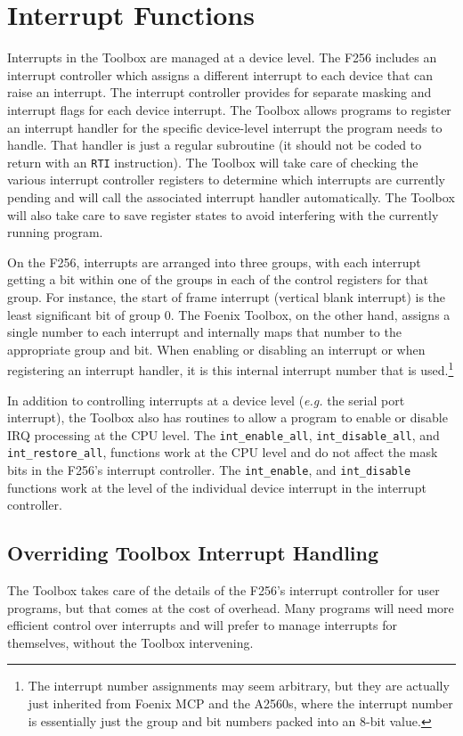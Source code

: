 \section{Interrupt Functions}
Interrupts in the Toolbox are managed at a device level.
The F256 includes an interrupt controller which assigns a different interrupt to each device that can raise an interrupt.
The interrupt controller provides for separate masking and interrupt flags for each device interrupt.
The Toolbox allows programs to register an interrupt handler for the specific device-level interrupt the program needs to handle.
That handler is just a regular subroutine (it should not be coded to return with an \verb+RTI+ instruction).
The Toolbox will take care of checking the various interrupt controller registers to determine which interrupts are currently pending
and will call the associated interrupt handler automatically. The Toolbox will also take care to save register states to avoid interfering
with the currently running program.

On the F256, interrupts are arranged into three groups, with each interrupt getting a bit within one of the groups in each of the 
control registers for that group. For instance, the start of frame interrupt (vertical blank interrupt) is the least significant bit of group 0.
The Foenix Toolbox, on the other hand, assigns a single number to each interrupt and internally maps that number to the appropriate group and bit.
When enabling or disabling an interrupt or when registering an interrupt handler, it is this internal interrupt number that is used.\footnote{The interrupt
number assignments may seem arbitrary, but they are actually just inherited from Foenix MCP and the A2560s, where the interrupt number is essentially just
the group and bit numbers packed into an 8-bit value.}

In addition to controlling interrupts at a device level ({\it e.g.} the serial port interrupt), the Toolbox also has routines to allow a program to
enable or disable IRQ processing at the CPU level. The \lstinline!int_enable_all!, \lstinline!int_disable_all!, and \lstinline!int_restore_all!,
functions work at the CPU level and do not affect the mask bits in the F256's interrupt controller. The \lstinline!int_enable!, and \lstinline!int_disable!
functions work at the level of the individual device interrupt in the interrupt controller.

\subsection*{Overriding Toolbox Interrupt Handling}
The Toolbox takes care of the details of the F256's interrupt controller for user programs, but that comes at the cost of overhead.
Many programs will need more efficient control over interrupts and will prefer to manage interrupts for themselves, without the 
Toolbox intervening.

